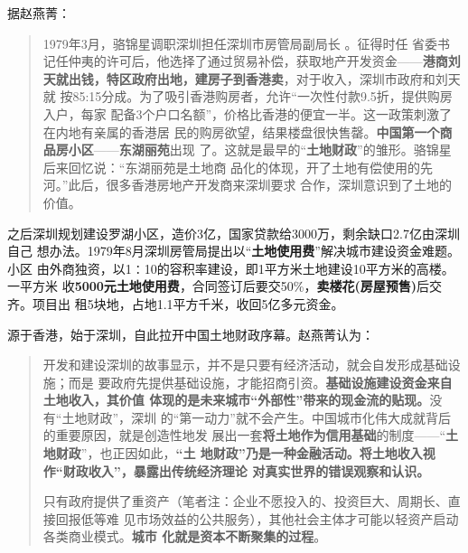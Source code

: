 据赵燕菁\cite{dajueqi}：
\begin{quotation}
  1979年3月，骆锦星调职深圳担任深圳市房管局副局长%
  。征得时任
  省委书记任仲夷的许可后，他选择了通过贸易补偿，获取地产开发资金——\textbf{港商刘
    天就出钱，特区政府出地，建房子到香港卖}，对于收入，深圳市政府和刘天就
  按85:15分成。为了吸引香港购房者，允许“一次性付款9.5折，提供购房入户，每家
  配备3个户口名额”，价格比香港的便宜一半。这一政策刺激了在内地有亲属的香港居
  民的购房欲望，结果楼盘很快售罄。\textbf{中国第一个商品房小区}——\textbf{东湖丽苑}出现
  了。这就是最早的“\textbf{土地财政}”的雏形。骆锦星后来回忆说：“东湖丽苑是土地商
  品化的体现，开了土地有偿使用的先河。”此后，很多香港房地产开发商来深圳要求
  合作，深圳意识到了土地的价值。
\end{quotation}

之后深圳规划建设罗湖小区，造价3亿，国家贷款给3000万，剩余缺口2.7亿由深圳自己
想办法。1979年8月深圳房管局提出以“\textbf{土地使用费}”解决城市建设资金难题。小区
由外商独资，以1∶10的容积率建设，即1平方米土地建设10平方米的高楼。一平方米
收\textbf{5000元土地使用费}，合同签订后要交50\%，\textbf{卖楼花(房屋预售)}后交齐。项目出
租5块地，占地1.1平方千米，收回5亿多元资金。

源于香港，始于深圳，自此拉开中国土地财政序幕。赵燕菁认为：
\begin{quotation}
  开发和建设深圳的故事显示，并不是只要有经济活动，就会自发形成基础设施；而是
  要政府先提供基础设施，才能招商引资。\textbf{基础设施建设资金来自土地收入，其价值
    体现的是未来城市“外部性”带来的现金流的贴现。}没有“土地财政”，深圳
  的“第一动力”就不会产生。中国城市化伟大成就背后的重要原因，就是创造性地发
  展出一套\textbf{将土地作为信用基础}的制度——“\textbf{土地财政}”，也正因如此，\textbf{“土
    地财政”乃是一种金融活动。将土地收入视作“财政收入”，暴露出传统经济理论
    对真实世界的错误观察和认识。}

  只有政府提供了重资产（笔者注：企业不愿投入的、投资巨大、周期长、直接回报低等难
  见市场效益的公共服务），其他社会主体才可能以轻资产启动各类商业模式。\textbf{城市
    化就是资本不断聚集的过程}。
\end{quotation}

